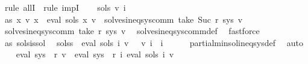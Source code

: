 \begin{isabellebody}
%
\isadelimproof
%
\endisadelimproof
%
\isatagproof
{}\isamarkupfalse%
\ {\isacharparenleft}{\kern0pt}rule\ allI\ {\isacharbar}{\kern0pt}\ rule\ impI{\isacharparenright}{\kern0pt}{\isacharplus}{\kern0pt}\isanewline
\ \ \isamarkupfalse%
\ sols{}\ v{}\ i\isanewline
\ \ \isamarkupfalse%
\ as{\isacharcolon}{\kern0pt}\ {\isachardoublequoteopen}{\isacharparenleft}{\kern0pt}{\isasymforall}x{\isachardot}{\kern0pt}\ v{}\ x\ {\isacharequal}{\kern0pt}\ eval\ {\isacharparenleft}{\kern0pt}sols{}\ x{\isacharparenright}{\kern0pt}\ v{}{\isacharparenright}{\kern0pt}\ {\isasymand}\ solves{\isacharunderscore}{\kern0pt}ineq{\isacharunderscore}{\kern0pt}sys{\isacharunderscore}{\kern0pt}comm\ {\isacharparenleft}{\kern0pt}take\ {\isacharparenleft}{\kern0pt}Suc\ r{\isacharparenright}{\kern0pt}\ sys{\isacharparenright}{\kern0pt}\ v{}{\isachardoublequoteclose}\isanewline
\ \ \isamarkupfalse%
\ \isamarkupfalse%
\ {\isachardoublequoteopen}solves{\isacharunderscore}{\kern0pt}ineq{\isacharunderscore}{\kern0pt}sys{\isacharunderscore}{\kern0pt}comm\ {\isacharparenleft}{\kern0pt}take\ r\ sys{\isacharparenright}{\kern0pt}\ v{}{\isachardoublequoteclose}\ \isamarkupfalse%
\ solves{\isacharunderscore}{\kern0pt}ineq{\isacharunderscore}{\kern0pt}sys{\isacharunderscore}{\kern0pt}comm{\isacharunderscore}{\kern0pt}def\ \isamarkupfalse%
\ fastforce\isanewline
\ \ \isamarkupfalse%
\ as\ sols{\isacharunderscore}{\kern0pt}is{\isacharunderscore}{\kern0pt}sol\ \isamarkupfalse%
\ sols{\isacharunderscore}{\kern0pt}s{}{\isacharcolon}{\kern0pt}\ {\isachardoublequoteopen}{\isasymPsi}\ {\isacharparenleft}{\kern0pt}eval\ {\isacharparenleft}{\kern0pt}sols\ i{\isacharparenright}{\kern0pt}\ v{}{\isacharparenright}{\kern0pt}\ {\isasymsubseteq}\ {\isasymPsi}\ {\isacharparenleft}{\kern0pt}v{}\ i{\isacharparenright}{\kern0pt}{\isachardoublequoteclose}\ \ i\isanewline
\ \ \ \ \isamarkupfalse%
\ partial{\isacharunderscore}{\kern0pt}min{\isacharunderscore}{\kern0pt}sol{\isacharunderscore}{\kern0pt}ineq{\isacharunderscore}{\kern0pt}sys{\isacharunderscore}{\kern0pt}def\ \isamarkupfalse%
\ auto\isanewline
\ \ \isamarkupfalse%
\ {\isachardoublequoteopen}eval\ {\isacharparenleft}{\kern0pt}sys{\isacharprime}{\kern0pt}\ {\isacharbang}{\kern0pt}\ r{\isacharparenright}{\kern0pt}\ v{}\ {\isacharequal}{\kern0pt}\ eval\ {\isacharparenleft}{\kern0pt}sys\ {\isacharbang}{\kern0pt}\ r{\isacharparenright}{\kern0pt}\ {\isacharparenleft}{\kern0pt}{\isasymlambda}i{\isachardot}{\kern0pt}\ eval\ {\isacharparenleft}{\kern0pt}sols\ i{\isacharparenright}{\kern0pt}\ v{}{\isacharparenright}{\kern0pt}{\isachardoublequoteclose}\isanewline

\end{isabellebody}
